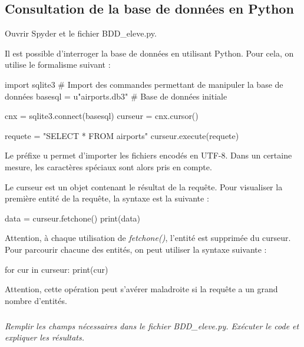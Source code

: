 \documentclass[10pt]{article}
\newif\ifprof
\begin{document}
\subsection*{Consultation de la base de données en Python}

\ifprof
\else
\begin{rem}
Ouvrir Spyder et le fichier \textsf{BDD\_eleve.py}.

\end{rem}
Il est possible d'interroger la base de données en utilisant Python. Pour cela, on utilise le formalisme suivant :

\begin{py}
\begin{python}
import sqlite3 # Import des commandes permettant de manipuler la base de données
basesql = u"airports.db3" # Base de données initiale

cnx = sqlite3.connect(basesql)
curseur = cnx.cursor()

requete = "SELECT * FROM airports"
curseur.execute(requete)
\end{python}

Le préfixe u permet d'importer les fichiers encodés en UTF-8. Dans un certaine mesure, les caractères spéciaux sont alors pris en compte.\end{py}


\begin{py}
Le curseur est un objet contenant le résultat de la requête. Pour visualiser la première entité de la requête, la syntaxe est la suivante : 
\begin{python}
data = curseur.fetchone()
print(data)
\end{python}

Attention, à chaque utilisation de \textsl{fetchone()}, l'entité est supprimée du curseur. Pour parcourir chacune des entités, on peut utiliser la syntaxe suivante : 
\begin{python}
for cur in curseur:
    print(cur)
\end{python}

Attention, cette opération peut s'avérer maladroite si la requête a un grand nombre d'entités. 
\end{py}

\fi

\subparagraph{}
\textit{Remplir les champs nécessaires dans le fichier \textsf{BDD\_eleve.py}. Exécuter le code et expliquer les résultats.}
\ifprof
\begin{corrige}
Il suffit de donner le nom du fichier correspondant à la base. 

Les lignes permettent de donner tous les attributs de 3 bases d'hydravions (au <<hasard>>).

\end{corrige}
\else
\fi
\end{document}
